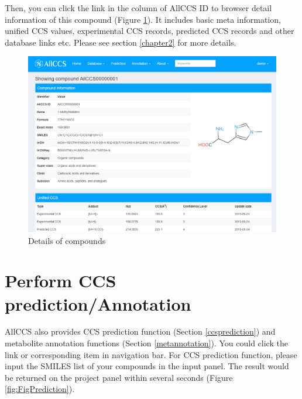\documentclass[12pt,]{book}
\begin{document}
Then, you can click the link in the column of AllCCS ID to browser
detail information of this compound (Figure \ref{fig:FigBrowser2}). It
includes basic meta information, unified CCS values, experimental CCS
records, predicted CCS records and other database links etc. Please see
section \ref{chapter2} for more details.

\begin{figure}

{\centering \includegraphics{images/chapter1/browser_2} 

}

\caption{Details of compounds}\label{fig:FigBrowser2}
\end{figure}

\section{Perform CCS prediction/Annotation}\label{chaptere1d3}

AllCCS also provides CCS prediction function (Section
\ref{ccsprediction}) and metabolite annotation functions (Section
\ref{metannotation}). You could click the link or corresponding item in
navigation bar. For CCS prediction function, please input the SMILES
list of your compounds in the input panel. The result would be returned
on the project panel within several seconds (Figure
\ref{fig:FigPrediction}).
\end{document}
